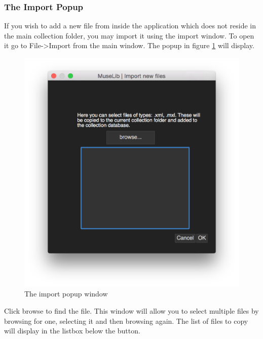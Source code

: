 \subsubsection{The Import Popup}
If you wish to add a new file from inside the application which does not reside in the main collection folder, you may import it using the import window. To open it go to File->Import from the main window. The popup in figure \ref{fig:import} will display.
\begin{figure}[H]
\centering
\includegraphics[width=500pt]{importpop}
\caption{The import popup window}
\label{fig:import}	
\end{figure}
Click browse to find the file. This window will allow you to select multiple files by browsing for one, selecting it and then browsing again. The list of files to copy will display in the listbox below the button.


